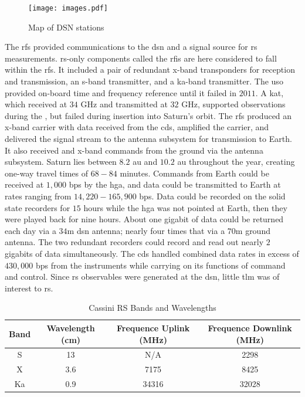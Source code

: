 \documentclass{article}
\theoremstyle{mystyle}
\begin{document}
\begin{figure}
	\centering
	\vspace{-5ex}
	\texttt{[image: images.pdf]}
	\caption{Map of DSN stations}
	\label{fig:usr_dsn_map_1}
\end{figure}

The \gls{rfs} provided communications to the \gls{dsn} and a signal source for \gls{rs} measurements. \gls{rs}-only components called the \gls{rfis} are here considered to fall within the \gls{rfs}. It included a pair of redundant \gls{x-band} \glspl{transponder} for reception and transmission, an \gls{s-band} \gls{transmitter}, and a \gls{ka-band}
\gls{transmitter}. The \gls{uso} provided on-board time and \gls{frequency} reference until it failed in $2011$. A \gls{kat}, which received at $34$ GHz and transmitted  at $32$ GHz, supported  observations during the , but failed during insertion into Saturn's orbit. The \gls{rfs} produced an \gls{x-band} \gls{carrier}  with data received from the \gls{cds}, amplified the  carrier, and delivered the signal stream to the antenna subsystem for transmission to Earth. It also received and  \gls{x-band} commands from the ground via the antenna subsystem. Saturn lies between $8.2$ \gls{au} and $10.2$ \gls{au} throughout the year, creating one-way travel times of $68-84$ minutes. Commands from Earth could be received at $1,000$ \gls{bps} by the \gls{hga}, and data could be transmitted to Earth at rates ranging from $14,220-165,900$ \gls{bps}. Data could be recorded on the solid state recorders for $15$ hours while the \gls{hga} was not pointed at Earth, then they were played back for nine hours. About one gigabit of data could be returned each day via a $34$m \gls{dsn} antenna; nearly four times that via a $70$m ground antenna. The two redundant recorders could record and read out nearly $2$ gigabits of data simultaneously. The \gls{cds} handled combined data rates in excess of $430,000$ \gls{bps} from the instruments while carrying on its functions of command and control. Since \gls{rs} observables were generated at the \gls{dsn}, little \gls{tlm} was of interest to \gls{rs}.

\begin{table}[H]
    \centering
    \caption{Cassini RS Bands and Wavelengths}
    \label{tab:usr_band_wav}
    \footnotesize
    \begin{tabular}{|c|c|c|c|}
        \hline
        Band & Wavelength (cm) & Frequence Uplink (MHz)
        & Frequence Downlink (MHz) \\
        \hline
        S  & 13  & N/A   & 2298 \\
        X  & 3.6 & 7175  & 8425 \\
        Ka & 0.9 & 34316 & 32028 \\
        \hline
    \end{tabular}
\end{table}
\end{document}
